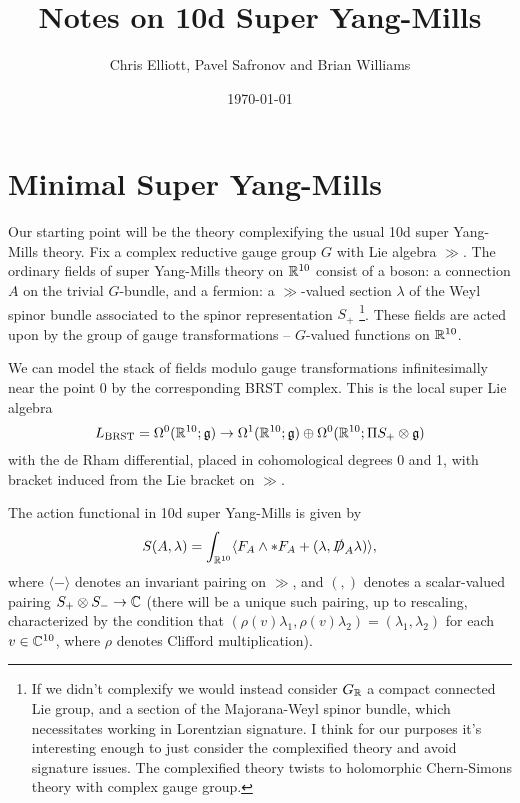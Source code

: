 \documentclass[10pt, oneside]{article}
\title{Notes on 10d Super Yang-Mills}
\author{Chris Elliott, Pavel Safronov and Brian Williams}
\date{\today}
\begin{document}
\maketitle

\section{Minimal Super Yang-Mills}
Our starting point will be the theory complexifying the usual 10d super Yang-Mills theory.  Fix a complex reductive gauge group $G$ with Lie algebra $\gg$.  The ordinary fields of super Yang-Mills theory on $\mathbb{R}^{10}$ consist of a boson: a connection $A$ on the trivial $G$-bundle, and a fermion: a $\gg$-valued section $\lambda$ of the Weyl spinor bundle associated to the spinor representation $S_+$ \footnote{If we didn't complexify we would instead consider $G_{\mathbb{R}}$ a compact connected Lie group, and a section of the Majorana-Weyl spinor bundle, which necessitates working in Lorentzian signature.  I think for our purposes it's interesting enough to just consider the complexified theory and avoid signature issues.  The complexified theory twists to holomorphic Chern-Simons theory with complex gauge group.}.  These fields are acted upon by the group of gauge transformations -- $G$-valued functions on $\mathbb{R}^{10}$.

We can model the stack of fields modulo gauge transformations infinitesimally near the point $0$ by the corresponding BRST complex.  This is the local super Lie algebra
\[L_{\mathrm{BRST}} = \Omega^0(\mathbb{R}^{10}; \mathfrak{g}) \to \Omega^1(\mathbb{R}^{10}; \mathfrak{g}) \oplus \Omega^0(\mathbb{R}^{10}; \Pi S_+ \otimes \mathfrak{g})\]
with the de Rham differential, placed in cohomological degrees 0 and 1, with bracket induced from the Lie bracket on $\gg$.

The action functional in 10d super Yang-Mills is given by
\[S(A,\lambda) = \int_{\mathbb{R}^{10}} \langle F_A \wedge \ast F_A + (\lambda, \slashed{D}_A \lambda)\rangle,\]
where $\langle - \rangle$ denotes an invariant pairing on $\gg$, and $(,)$ denotes a scalar-valued pairing $S_+ \otimes S_- \to \mathbb{C}$ (there will be a unique such pairing, up to rescaling, characterized by the condition that $(\rho(v)\lambda_1,\rho(v)\lambda_2) = (\lambda_1,\lambda_2)$ for each $v \in \mathbb{C}^{10}$, where $\rho$ denotes Clifford multiplication).
\end{document}

